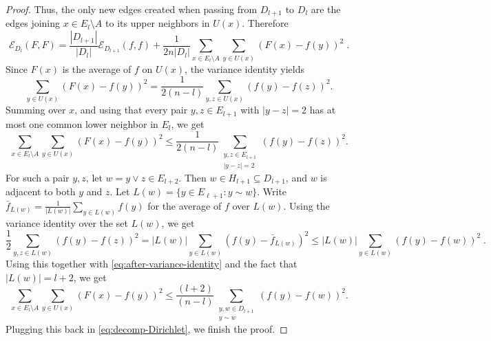 \documentclass[10pt,a4paper]{amsart}
\newcommand{\Ecal}{\mathcal{E}}
\begin{document}
\begin{proof}
Thus, the only new edges created when passing from $D_{l+1}$ to $D_l$ are the edges joining $x\in E_l\setminus A$ to its upper neighbors in $U(x)$. Therefore 
\begin{equation}
\label{eq:decomp-Dirichlet}
    \Ecal_{D_{l}}(F, F) = \frac{|D_{l+1}|}{|D_{l}|}\Ecal_{D_{l+1}}(f, f) + \frac{1}{2n|D_{l}|}\sum_{x\in E_l\setminus A}\sum_{y\in U(x)}(F(x)-f(y))^2\;.
\end{equation}
Since $F(x)$ is the average of $f$ on $U(x)$, the variance identity yields 
$$
    \sum_{y\in U(x)}(F(x)-f(y))^2= \frac{1}{2(n-l)} \sum_{y,z\in U(x)} (f(y)-f(z))^2. 
$$
Summing over $x$, and using that every pair $y,z\in E_{l+1}$ with $|y-z|=2$ has at most one common lower neighbor in $E_l$, we get 
\begin{equation}\label{eq:after-variance-identity}
  \sum_{x\in E_l\setminus A}\sum_{y\in U(x)}(F(x)-f(y))^2\leq \frac{1}{2(n-l)} \sum_{\substack{y,z\in E_{l+1}\\ |y-z|=2}}  (f(y)-f(z))^2.
\end{equation}
For such a pair $y,z$, let $w=y\vee z\in E_{l+2}$. Then $w\in H_{l+1}\subseteq D_{l+1}$, and $w$ is adjacent to both $y$ and $z$. Let $L(w)=\{y\in E_{\ell+1}: y\sim w\}$. Write $\bar{f}_{L(w)}=\frac{1}{|L(w)|}\sum_{y\in L(w)}f(y)$ for the average of $f$ over $L(w)$. Using the variance identity over the set $L(w)$, we get 
\[
\frac{1}{2}\sum_{y, z\in L(w)}(f(y)-f(z))^2 = |L(w)|\sum_{y\in L(w)}(f(y)-\bar{f}_{L(w)})^2\leq |L(w)|\sum_{y\in L(w)}(f(y)-f(w))^2\;.
\]
Using this together with \eqref{eq:after-variance-identity} and the fact that $|L(w)|=l+2$, we get 
$$
\sum_{x\in E_l\setminus A}\sum_{y\in U(x)}(F(x)-f(y))^2\leq \frac{(l+2)}{(n-l)} \sum_{\substack{y,w\in D_{l+1}\\ y\sim w}}  (f(y)-f(w))^2.
$$
Plugging this back in \eqref{eq:decomp-Dirichlet}, we finish the proof. 
\end{proof}
\end{document}
